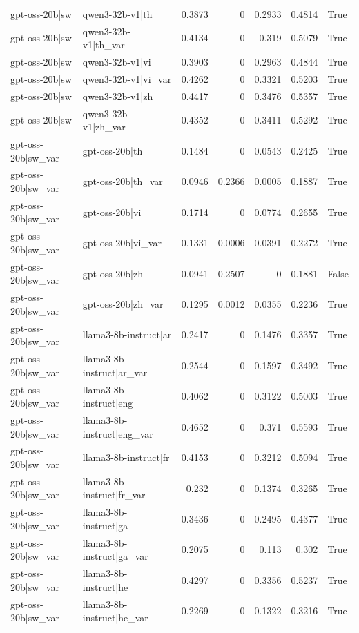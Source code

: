 \begin{table}
\begin{tabular}{l l r r r r l}
gpt-oss-20b|sw & qwen3-32b-v1|th & 0.3873 & 0 & 0.2933 & 0.4814 & True \\
gpt-oss-20b|sw & qwen3-32b-v1|th_var & 0.4134 & 0 & 0.319 & 0.5079 & True \\
gpt-oss-20b|sw & qwen3-32b-v1|vi & 0.3903 & 0 & 0.2963 & 0.4844 & True \\
gpt-oss-20b|sw & qwen3-32b-v1|vi_var & 0.4262 & 0 & 0.3321 & 0.5203 & True \\
gpt-oss-20b|sw & qwen3-32b-v1|zh & 0.4417 & 0 & 0.3476 & 0.5357 & True \\
gpt-oss-20b|sw & qwen3-32b-v1|zh_var & 0.4352 & 0 & 0.3411 & 0.5292 & True \\
gpt-oss-20b|sw_var & gpt-oss-20b|th & 0.1484 & 0 & 0.0543 & 0.2425 & True \\
gpt-oss-20b|sw_var & gpt-oss-20b|th_var & 0.0946 & 0.2366 & 0.0005 & 0.1887 & True \\
gpt-oss-20b|sw_var & gpt-oss-20b|vi & 0.1714 & 0 & 0.0774 & 0.2655 & True \\
gpt-oss-20b|sw_var & gpt-oss-20b|vi_var & 0.1331 & 0.0006 & 0.0391 & 0.2272 & True \\
gpt-oss-20b|sw_var & gpt-oss-20b|zh & 0.0941 & 0.2507 & -0 & 0.1881 & False \\
gpt-oss-20b|sw_var & gpt-oss-20b|zh_var & 0.1295 & 0.0012 & 0.0355 & 0.2236 & True \\
gpt-oss-20b|sw_var & llama3-8b-instruct|ar & 0.2417 & 0 & 0.1476 & 0.3357 & True \\
gpt-oss-20b|sw_var & llama3-8b-instruct|ar_var & 0.2544 & 0 & 0.1597 & 0.3492 & True \\
gpt-oss-20b|sw_var & llama3-8b-instruct|eng & 0.4062 & 0 & 0.3122 & 0.5003 & True \\
gpt-oss-20b|sw_var & llama3-8b-instruct|eng_var & 0.4652 & 0 & 0.371 & 0.5593 & True \\
gpt-oss-20b|sw_var & llama3-8b-instruct|fr & 0.4153 & 0 & 0.3212 & 0.5094 & True \\
gpt-oss-20b|sw_var & llama3-8b-instruct|fr_var & 0.232 & 0 & 0.1374 & 0.3265 & True \\
gpt-oss-20b|sw_var & llama3-8b-instruct|ga & 0.3436 & 0 & 0.2495 & 0.4377 & True \\
gpt-oss-20b|sw_var & llama3-8b-instruct|ga_var & 0.2075 & 0 & 0.113 & 0.302 & True \\
gpt-oss-20b|sw_var & llama3-8b-instruct|he & 0.4297 & 0 & 0.3356 & 0.5237 & True \\
gpt-oss-20b|sw_var & llama3-8b-instruct|he_var & 0.2269 & 0 & 0.1322 & 0.3216 & True \\

\end{tabular}
\end{table}
